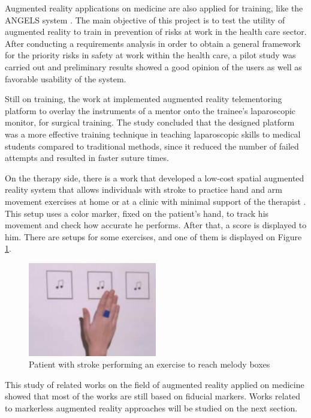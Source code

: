 \documentclass[msc, a4paper, classic, en]{ufbathesis}
\begin{document}
Augmented reality applications on medicine are also applied for training, like the ANGELS system \cite{angels}. The main objective of this project is to test the utility of augmented reality to train in prevention of risks at work in the health care sector. After conducting a requirements analysis in order to obtain a general framework for the priority risks in safety at work within the health care, a pilot study was carried out and preliminary results showed a good opinion of the users as well as favorable usability of the system.

Still on training, the work at \cite{endo} implemented augmented reality telementoring platform to overlay the instruments of a mentor onto the trainee's laparoscopic monitor, for surgical training. The study concluded that the designed platform was a more effective training technique in teaching laparoscopic skills to medical students compared to traditional methods, since it reduced the number of failed attempts and resulted in faster suture times.

On the therapy side, there is a work that developed a low-cost spatial augmented reality system that allows individuals with stroke to practice hand and arm movement exercises at home or at a clinic with minimal support of the therapist \cite{stroke}. This setup uses a color marker, fixed on the patient's hand, to track his movement and check how accurate he performs. After that, a score is displayed to him. There are setups for some exercises, and one of them is displayed on Figure \ref{fig:stroke}.

\begin{figure}
\centering
\includegraphics[width=0.5\textwidth]{images/stroke.png}
\caption{Patient with stroke performing an exercise to reach melody boxes \cite{stroke}}
\label{fig:stroke}
\end{figure}

This study of related works on the field of augmented reality applied on medicine showed that most of the works are still based on fiducial markers. Works related to markerless augmented reality approaches will be studied on the next section.
\end{document}
